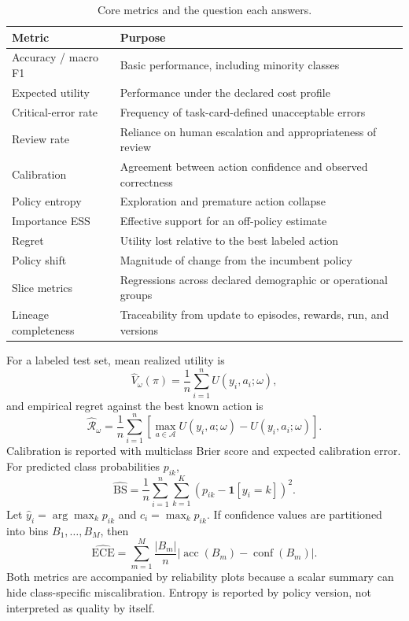 \documentclass[conference]{IEEEtran}
\begin{document}
\begin{table}[t]
\centering
\caption{Core metrics and the question each answers.}
\label{tab:metrics}
\renewcommand{\arraystretch}{1.13}
\begin{tabular}{@{}p{2.2cm}p{5.2cm}@{}}
\toprule
\textbf{Metric} & \textbf{Purpose} \\
\midrule
Accuracy / macro F1 & Basic performance, including minority classes \\
Expected utility & Performance under the declared cost profile \\
Critical-error rate & Frequency of task-card-defined unacceptable errors \\
Review rate & Reliance on human escalation and appropriateness of review \\
Calibration & Agreement between action confidence and observed correctness \\
Policy entropy & Exploration and premature action collapse \\
Importance ESS & Effective support for an off-policy estimate \\
Regret & Utility lost relative to the best labeled action \\
Policy shift & Magnitude of change from the incumbent policy \\
Slice metrics & Regressions across declared demographic or operational groups \\
Lineage completeness & Traceability from update to episodes, rewards, run, and versions \\
\bottomrule
\end{tabular}
\end{table}

For a labeled test set, mean realized utility is
\begin{equation}
\widehat{V}_{\omega}(\pi)=\frac{1}{n}\sum_{i=1}^{n}
U(y_i,a_i;\omega),
\label{eq:value}
\end{equation}
and empirical regret against the best known action is
\begin{equation}
\widehat{\mathcal{R}}_{\omega}=\frac{1}{n}\sum_{i=1}^{n}
\left[\max_{a\in\mathcal{A}}U(y_i,a;\omega)
-U(y_i,a_i;\omega)\right].
\label{eq:regret}
\end{equation}
Calibration is reported with multiclass Brier score and expected
calibration error. For predicted class probabilities $p_{ik}$,
\begin{equation}
\widehat{\mathrm{BS}}=\frac{1}{n}\sum_{i=1}^{n}\sum_{k=1}^{K}
\left(p_{ik}-\mathbf{1}[y_i=k]\right)^2.
\label{eq:brier}
\end{equation}
Let $\widehat{y}_i=\arg\max_kp_{ik}$ and
$c_i=\max_kp_{ik}$. If confidence values are partitioned into bins
$B_1,\ldots,B_M$, then
\begin{equation}
\widehat{\mathrm{ECE}}=\sum_{m=1}^{M}\frac{|B_m|}{n}
\left|\operatorname{acc}(B_m)-\operatorname{conf}(B_m)\right|.
\label{eq:ece}
\end{equation}
Both metrics are accompanied by reliability plots because a scalar
summary can hide class-specific miscalibration. Entropy is reported
by policy version, not interpreted as quality by itself.
\end{document}
